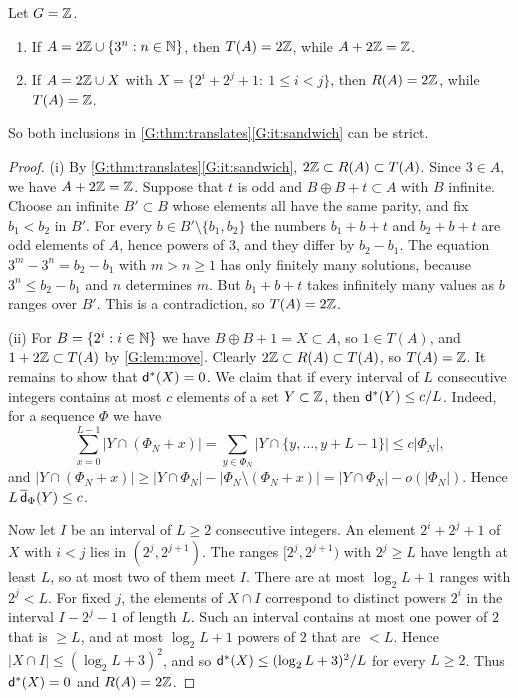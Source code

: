 \begin{proposition}\label{G:prop:strict}
Let $G=\mathbb{Z}$.
\begin{enumerate}[label=\textup{(\roman*)}]
\item If $A=2\mathbb{Z}\cup\{3^n:n\in\mathbb{N}\}$, then $T(A)=2\mathbb{Z}$, while $A+2\mathbb{Z}=\mathbb{Z}$.
\item If $A=2\mathbb{Z}\cup X$ with $X=\{2^i+2^j+1:\ 1\le i<j\}$, then $R(A)=2\mathbb{Z}$, while
$T(A)=\mathbb{Z}$.
\end{enumerate}
So both inclusions in \cref{G:thm:translates}\ref{G:it:sandwich} can be strict.
\end{proposition}

\begin{proof}
(i) By \cref{G:thm:translates}\ref{G:it:sandwich}, $2\mathbb{Z}\subset R(A)\subset T(A)$. Since
$3\in A$, we have $A+2\mathbb{Z}=\mathbb{Z}$. Suppose that $t$ is odd and $B\oplus B+t\subset A$ with $B$
infinite. Choose an infinite $B'\subset B$ whose elements all have the same parity, and fix
$b_1<b_2$ in $B'$. For every $b\in B'\setminus\{b_1,b_2\}$ the numbers $b_1+b+t$ and
$b_2+b+t$ are odd elements of $A$, hence powers of $3$, and they differ by $b_2-b_1$. The
equation $3^m-3^n=b_2-b_1$ with $m>n\ge1$ has only finitely many solutions, because
$3^n\le b_2-b_1$ and $n$ determines $m$. But $b_1+b+t$ takes infinitely many values as $b$
ranges over $B'$. This is a contradiction, so $T(A)=2\mathbb{Z}$.

(ii) For $B=\{2^i:i\in\mathbb{N}\}$ we have $B\oplus B+1=X\subset A$, so $1\in T(A)$, and
$1+2\mathbb{Z}\subset T(A)$ by \cref{G:lem:move}. Clearly $2\mathbb{Z}\subset R(A)\subset T(A)$, so $T(A)=\mathbb{Z}$. It remains to show that
$\mathsf{d}^*(X)=0$. We claim that if every interval of $L$ consecutive integers contains at most
$c$ elements of a set $Y\subset\mathbb{Z}$, then $\mathsf{d}^*(Y)\le c/L$. Indeed, for a \Fol{} sequence
$\Phi$ we have
\[
\sum_{x=0}^{L-1}|Y\cap(\Phi_N+x)|=\sum_{y\in\Phi_N}|Y\cap\{y,\dots,y+L-1\}|\le c|\Phi_N|,
\]
and $|Y\cap(\Phi_N+x)|\ge|Y\cap\Phi_N|-|\Phi_N\setminus(\Phi_N+x)|=|Y\cap\Phi_N|-o(|\Phi_N|)$.
Hence $L\,\overline{\mathsf{d}}_\Phi(Y)\le c$.

Now let $I$ be an interval of $L\ge2$ consecutive integers. An element $2^i+2^j+1$ of
$X$ with $i<j$ lies in $(2^j,2^{j+1})$. The ranges $[2^j,2^{j+1})$ with $2^j\ge L$ have
length at least $L$, so at most two of them meet $I$. There are at most $\log_2L+1$ ranges
with $2^j<L$. For fixed $j$, the elements of $X\cap I$ correspond to distinct powers $2^i$
in the interval $I-2^j-1$ of length $L$. Such an interval contains at most one power of $2$
that is $\ge L$, and at most $\log_2L+1$ powers of $2$ that are $<L$. Hence
$|X\cap I|\le(\log_2L+3)^2$, and so $\mathsf{d}^*(X)\le(\log_2L+3)^2/L$ for every $L\ge2$. Thus
$\mathsf{d}^*(X)=0$ and $R(A)=2\mathbb{Z}$.
\end{proof}

